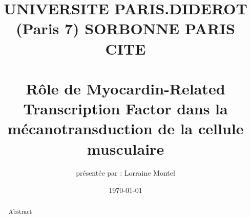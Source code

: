 \documentclass[10pt,twoside,openright]{report}
\title{{\large UNIVERSITE PARIS.DIDEROT (Paris 7) SORBONNE PARIS CITE }\\
\\
	{Rôle de Myocardin-Related Transcription Factor dans la mécanotransduction de la cellule musculaire}}
\author{présentée par : Lorraine Montel}
\date{\today}
\begin{document}


\begin{abstract}
Abstract
\end{abstract}
\tableofcontents
























\newpage
\printbibliography
\end{document}
